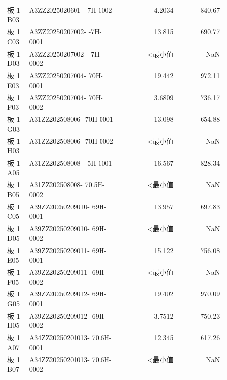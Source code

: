 \documentclass[UTF8,10pt,a4paper,fontset=fandol]{ctexart}
\begin{document}
\begin{tabular}{@{}p{0.10\linewidth}p{0.42\linewidth}r@{\quad}r@{}}
板 1 B03 & A3ZZ2025020601- \newline 71-7H-0002 & 4.2034 & 840.67 \\
板 1 C03 & A3ZZ20250207002- \newline 69-7H-0001 & 13.815 & 690.77 \\
板 1 D03 & A3ZZ20250207002- \newline 69-7H-0002 & \textless 最小值 & NaN \\
板 1 E03 & A3ZZ20250207004- \newline 70H-0001 & 19.442 & 972.11 \\
板 1 F03 & A3ZZ20250207004- \newline 70H-0002 & 3.6809 & 736.17 \\
板 1 G03 & A31ZZ202508006- \newline 70H-0001 & 13.098 & 654.88 \\
板 1 H03 & A31ZZ202508006- \newline 70H-0002 & \textless 最小值 & NaN \\
板 1 A05 & A31ZZ202508008- \newline 70-5H-0001 & 16.567 & 828.34 \\
板 1 B05 & A31ZZ202508008- \newline 70.5H-0002 & \textless 最小值 & NaN \\
板 1 C05 & A39ZZ20250209010- \newline 69H-0001 & 13.957 & 697.83 \\
板 1 D05 & A39ZZ20250209010- \newline 69H-0002 & \textless 最小值 & NaN \\
板 1 E05 & A39ZZ20250209011- \newline 69H-0001 & 15.122 & 756.08 \\
板 1 F05 & A39ZZ20250209011- \newline 69H-0002 & \textless 最小值 & NaN \\
板 1 G05 & A39ZZ20250209012- \newline 69H-0001 & 19.402 & 970.09 \\
板 1 H05 & A39ZZ20250209012- \newline 69H-0002 & 3.7512 & 750.23 \\
板 1 A07 & A34ZZ20250201013- \newline 70.6H-0001 & 12.345 & 617.26 \\
板 1 B07 & A34ZZ20250201013- \newline 70.6H-0002 & \textless 最小值 & NaN \\

\end{tabular}
\end{document}

